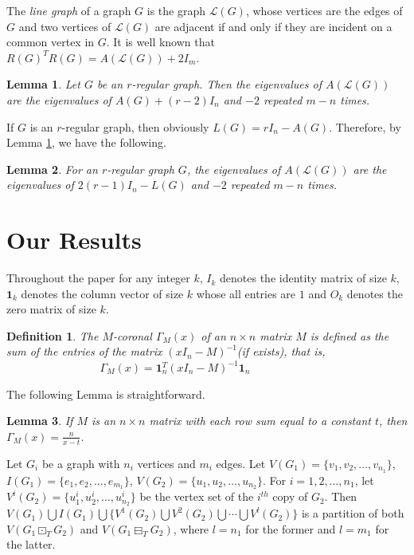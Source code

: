 \documentclass[a4paper,12pt]{article}
\newtheorem{lemma}{Lemma}[section]
\newtheorem{definition}{Definition}[section]
\begin{document}
The \emph{line graph} \cite{God} of a graph $G$ is the graph $\mathcal{L}(G)$, whose vertices are the edges of $G$ and two vertices of $\mathcal{L}(G)$ are adjacent if and only if they are incident on a common vertex in $G$. It is well known \cite{Cve} that $R(G)^{T}R(G)=A(\mathcal{L}(G))+2I_{m}$.
\begin{lemma}\label{line1}
\cite{Cve} Let $G$ be an $r$-regular graph. Then the eigenvalues of $A(\mathcal{L}(G))$ are the eigenvalues of $A(G)+(r-2)I_{n}$ and $-2$ repeated $m-n$ times.
\end{lemma}
If $G$ is an $r$-regular graph, then obviously $L(G)=rI_{n}-A(G)$. Therefore, by Lemma \ref{line1}, we have the following.
\begin{lemma}\label{line2}
For an $r$-regular graph $G$, the eigenvalues of $A(\mathcal{L}(G))$ are the eigenvalues of $2(r-1)I_{n}-L(G)$ and $-2$ repeated $m-n$ times.
\end{lemma}
\section{Our Results}\label{sec:2}
Throughout the paper for any integer $k$, $I_{k}$ denotes the identity matrix of size $k$, $\mathbf{1}_{k}$ denotes the column vector of size $k$ whose all entries are $1$ and $O_{k}$ denotes the zero matrix of size $k$. 
\begin{definition}
\rm{\cite{Cu,Mc} The \textit{$M$-coronal} $\Gamma_{M}(x)$ of an $n\times n$ matrix $M$ is defined as the sum of the entries
of the matrix $(xI_{n}-M)^{-1}$(if exists), that is,\\
$~~~~~~~~~~~~~~~~~~~~~~~~~~~~~~~~~~~~~~\Gamma_{M}(x)=\mathbf{1}^{T}_{n}(xI_{n}-M)^{-1}\mathbf{1}_{n}$}
\end{definition}
\noindent
The following Lemma is straightforward.
\begin{lemma}\label{le2}
\cite{Cu} If $M$ is an $n\times n$ matrix with each row sum equal to a constant
$t$, then
$\Gamma_{M}(x)=\frac{n}{x-t}$.
\end{lemma}
Let $G_{i}$ be a graph with $n_{i}$ vertices and $m_{i}$ edges. Let $V(G_{1})=\{v_{1},v_{2},\ldots,v_{n_{1}}\}$, $I(G_{1})=\{e_{1},e_{2},\ldots,e_{m_{1}}\}$, $V(G_{2})=\{u_{1},u_{2},\ldots,u_{n_{2}}\}$. 
For $i=1,2,\ldots,n_{1}$, let $V^{i}(G_{2})=\{u^{i}_{1},u^{i}_{2},\ldots,u^{i}_{n_{2}}\}$ be the vertex set of the $i^{th}$ copy of $G_{2}$. Then $V(G_{1})\bigcup I(G_{1})\bigcup \{V^{1}(G_{2})\bigcup V^{2}(G_{2})\bigcup \cdots \bigcup V^{l}(G_{2})\}$ is a partition of both $V(G_{1}\boxdot_{T} G_{2})$ and $V(G_{1}\boxminus_{T} G_{2})$, where $l=n_{1}$ for the former and $l=m_{1}$ for the latter.
\end{document}
